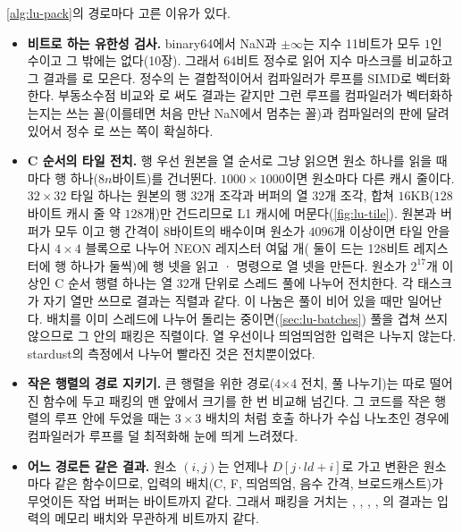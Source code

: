 \cref{alg:lu-pack}의 경로마다 고른 이유가 있다.
\begin{itemize}
\item \textbf{비트로 하는 유한성 검사.} binary64에서 NaN과 $\pm\infty$는 지수 11비트가 모두 $1$인 수이고 그 밖에는 없다(10장). 그래서 64비트 정수로 읽어 지수 마스크를 비교하고 그 결과를 로 모은다. 정수의 는 결합적이어서 컴파일러가 루프를 SIMD로 벡터화한다. 부동소수점 비교와 로 써도 결과는 같지만 그런 루프를 컴파일러가 벡터화하는지는 쓰는 꼴(이를테면 처음 만난 NaN에서 멈추는 꼴)과 컴파일러의 판에 달려 있어서 정수 로 쓰는 쪽이 확실하다.
\item \textbf{C 순서의 타일 전치.} 행 우선 원본을 열 순서로 그냥 읽으면 원소 하나를 읽을 때마다 행 하나($8n$바이트)를 건너뛴다. $1000\times1000$이면 원소마다 다른 캐시 줄이다. $32\times32$ 타일 하나는 원본의 행 32개 조각과 버퍼의 열 32개 조각, 합쳐 $16$KB($128$바이트 캐시 줄 약 $128$개)만 건드리므로 L1 캐시에 머문다(\cref{fig:lu-tile}). 원본과 버퍼가 모두 이고 행 간격이 8바이트의 배수이며 원소가 $4096$개 이상이면 타일 안을 다시 $4\times4$ 블록으로 나누어 NEON 레지스터 여덟 개( 둘이 드는 128비트 레지스터에 행 하나가 둘씩)에 행 넷을 읽고 · 명령으로 열 넷을 만든다. 원소가 $2^{17}$개 이상인 C 순서 행렬 하나는 열 $32$개 단위로 스레드 풀에 나누어 전치한다. 각 태스크가 자기 열만 쓰므로 결과는 직렬과 같다. 이 나눔은 풀이 비어 있을 때만 일어난다. 배치를 이미 스레드에 나누어 돌리는 중이면(\cref{sec:lu-batches}) 풀을 겹쳐 쓰지 않으므로 그 안의 패킹은 직렬이다. 열 우선이나 띄엄띄엄한 입력은 나누지 않는다. stardust의 측정에서 나누어 빨라진 것은 전치뿐이었다.
\item \textbf{작은 행렬의 경로 지키기.} 큰 행렬을 위한 경로(4×4 전치, 풀 나누기)는 따로 떨어진 함수에 두고 패킹의 맨 앞에서 크기를 한 번 비교해 넘긴다. 그 코드를 작은 행렬의 루프 안에 두었을 때는 $3\times3$ 배치의 처럼 호출 하나가 수십 나노초인 경우에 컴파일러가 루프를 덜 최적화해 눈에 띄게 느려졌다.
\item \textbf{어느 경로든 같은 결과.} 원소 $(i,j)$는 언제나 $D[j\cdot\mathit{ld}+i]$로 가고 변환은 원소마다 같은 함수이므로, 입력의 배치(C, F, 띄엄띄엄, 음수 간격, 브로드캐스트)가 무엇이든 작업 버퍼는 바이트까지 같다. 그래서 패킹을 거치는 , , , , 의 결과는 입력의 메모리 배치와 무관하게 비트까지 같다.
\end{itemize}

